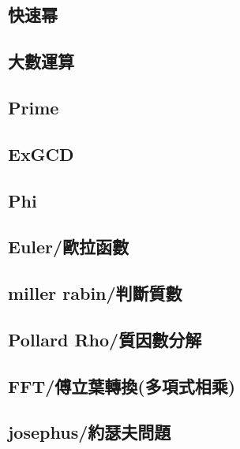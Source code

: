 \documentclass[a4paper,10pt,twocolumn,oneside]{article}
\begin{document}
    \subsection{快速幂}
    

    \subsection{大數運算}
    

    \subsection{Prime}
    

    \subsection{ExGCD}
    

    \subsection{Phi}
    

    \subsection{Euler/歐拉函數}
    

    \subsection{miller rabin/判斷質數}
    

    \subsection{Pollard Rho/質因數分解}
    

    \subsection{FFT/傅立葉轉換(多項式相乘)}
    

    \subsection{josephus/約瑟夫問題}
    
\end{document}
